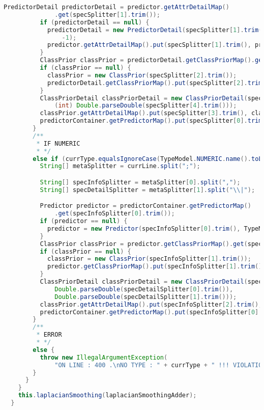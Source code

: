 \begin{lstlisting}[language=Java,basicstyle=\tiny,caption=TestingMapper.java]
          PredictorDetail predictorDetail = predictor.getAttrDetailMap()
              .get(specSplitter[1].trim());
          if (predictorDetail == null) {
            predictorDetail = new PredictorDetail(specSplitter[1].trim(),
                -1);
            predictor.getAttrDetailMap().put(specSplitter[1].trim(), predictorDetail);
          }
          ClassPrior classPrior = predictorDetail.getClassPriorMap().get(specSplitter[2].trim());
          if (classPrior == null) {
            classPrior = new ClassPrior(specSplitter[2].trim());
            predictorDetail.getClassPriorMap().put(specSplitter[2].trim(), classPrior);
          }
          ClassPriorDetail classPriorDetail = new ClassPriorDetail(specSplitter[3].trim(),
              (int) Double.parseDouble(specSplitter[4].trim()));
          classPrior.getAttrDetailMap().put(specSplitter[3].trim(), classPriorDetail);
          predictorContainer.getPredictorMap().put(specSplitter[0].trim(), predictor);
        }
        /**
         * IF NUMERIC
         * */
        else if (currType.equalsIgnoreCase(TypeModel.NUMERIC.name().toLowerCase())) {
          String[] metaSplitter = currLine.split(";");

          String[] specInfoSplitter = metaSplitter[0].split(",");
          String[] specDetailSplitter = metaSplitter[1].split("\\|");

          Predictor predictor = predictorContainer.getPredictorMap()
              .get(specInfoSplitter[0].trim());
          if (predictor == null) {
            predictor = new Predictor(specInfoSplitter[0].trim(), TypeModel.NUMERIC);
          }
          ClassPrior classPrior = predictor.getClassPriorMap().get(specInfoSplitter[1].trim());
          if (classPrior == null) {
            classPrior = new ClassPrior(specInfoSplitter[1].trim());
            predictor.getClassPriorMap().put(specInfoSplitter[1].trim(), classPrior);
          }
          ClassPriorDetail classPriorDetail = new ClassPriorDetail(specInfoSplitter[2].trim(), -1,
              Double.parseDouble(specDetailSplitter[0].trim()),
              Double.parseDouble(specDetailSplitter[1].trim()));
          classPrior.getAttrDetailMap().put(specInfoSplitter[2].trim(), classPriorDetail);
          predictorContainer.getPredictorMap().put(specInfoSplitter[0].trim(), predictor);
        }
        /**
         * ERROR
         * */
        else {
          throw new IllegalArgumentException(
              "ON LINE : 400 .\nNO TYPE : " + currType + " !!! VIOLATION ON MODELS");
        }
      }
    }
    this.laplacianSmoothing(laplacianSmoothingAdder);
  }


\end{lstlisting}
